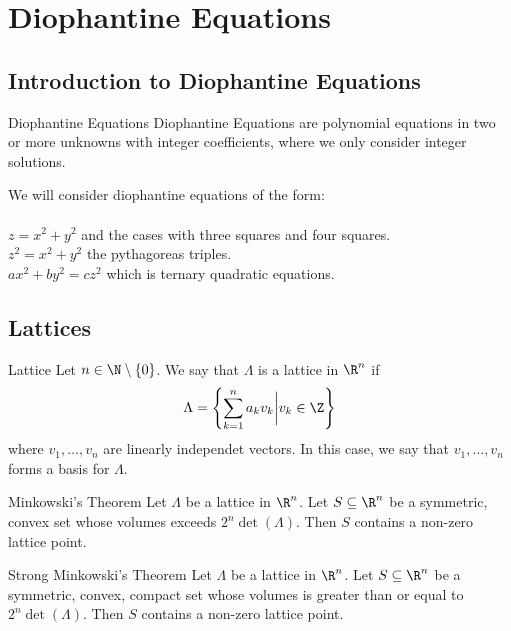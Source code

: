 \documentclass[a4paper]{article}
\begin{document}
\pagebreak
\section{Diophantine Equations}
\subsection{Introduction to Diophantine Equations}
\begin{defn}{Diophantine Equations}{} Diophantine Equations are polynomial equations in two or more unknowns with integer coefficients, where we only consider integer solutions. 
\end{defn}

We will consider diophantine equations of the form: \\~\\
$z=x^2+y^2$ and the cases with three squares and four squares. \\
$z^2=x^2+y^2$ the pythagoreas triples. \\
$ax^2+by^2=cz^2$ which is ternary quadratic equations. 

\subsection{Lattices}
\begin{defn}{Lattice}{} Let $n\in\N\setminus\{0\}$. We say that $\Lambda$ is a lattice in $\R^n$ if $$\Lambda=\left\{\sum_{k=1}^na_kv_k\bigg{|}v_k\in\Z\right\}$$ where $v_1,\dots,v_n$ are linearly independet vectors. In this case, we say that $v_1,\dots,v_n$ forms a basis for $\Lambda$. 
\end{defn}

\begin{thm}{Minkowski's Theorem}{} Let $\Lambda$ be a lattice in $\R^n$. Let $S\subseteq\R^n$ be a symmetric, convex set whose volumes exceeds $2^n\det(\Lambda)$. Then $S$ contains a non-zero lattice point. 
\end{thm}

\begin{crl}{Strong Minkowski's Theorem}{} Let $\Lambda$ be a lattice in $\R^n$. Let $S\subseteq\R^n$ be a symmetric, convex, compact set whose volumes is greater than or equal to $2^n\det(\Lambda)$. Then $S$ contains a non-zero lattice point. 
\end{crl}
\end{document}
